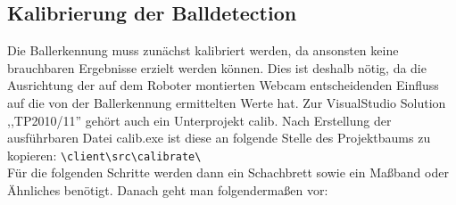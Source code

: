 
\subsection{Kalibrierung der Balldetection}
\label{sec:kalibr-der-balld}
Die Ballerkennung muss zunächst kalibriert werden, da ansonsten keine
brauchbaren Ergebnisse erzielt werden können. Dies ist deshalb nötig,
da die Ausrichtung der auf dem Roboter montierten Webcam
entscheidenden Einfluss auf die von der Ballerkennung ermittelten
Werte hat. Zur VisualStudio Solution ,,TP2010/11'' gehört auch ein
Unterprojekt calib. Nach Erstellung der ausführbaren Datei calib.exe
ist diese an folgende Stelle des Projektbaums zu kopieren:
\verb|\client\src\calibrate\| \\ 
Für die folgenden Schritte werden dann ein Schachbrett sowie ein
Maßband oder Ähnliches benötigt. 
Danach geht man folgendermaßen vor:
